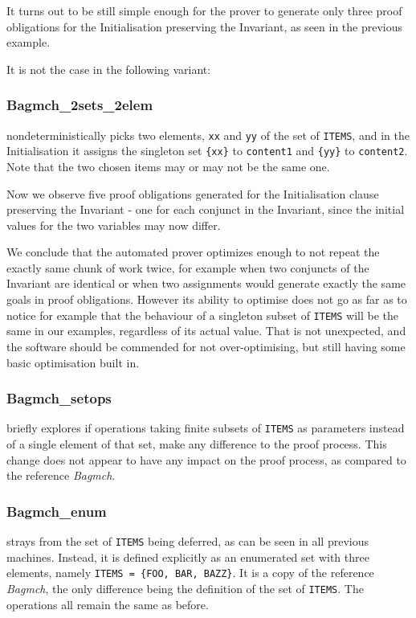 \documentclass[12pt,journal,duplex]{IEEEtran}
\begin{document}
	It turns out to be still simple enough for the prover to generate only three proof obligations for the Initialisation preserving the Invariant, as seen in the previous example.

	It is not the case in the following variant:

	\subsubsection{Bagmch\_2sets\_2elem} nondeterministically picks two elements, \texttt{xx} and \texttt{yy} of the set of \texttt{ITEMS}, and in the Initialisation it assigns the singleton set \texttt{\{xx\}} to \texttt{content1} and \texttt{\{yy\}} to \texttt{content2}. Note that the two chosen items may or may not be the same one.

	Now we observe five proof obligations generated for the Initialisation clause preserving the Invariant - one for each conjunct in the Invariant, since the initial values for the two variables may now differ.

	We conclude that the automated prover optimizes enough to not repeat the exactly same chunk of work twice, for example when two conjuncts of the Invariant are identical or when two assignments would generate exactly the same goals in proof obligations. However its ability to optimise does not go as far as to notice for example that the behaviour of a singleton subset of \texttt{ITEMS} will be the same in our examples, regardless of its actual value. That is not unexpected, and the software should be commended for not over-optimising, but still having some basic optimisation built in.

	\subsubsection{Bagmch\_setops} briefly explores if operations taking finite subsets of \texttt{ITEMS} as parameters instead of a single element of that set, make any difference to the proof process. This change does not appear to have any impact on the proof process, as compared to the reference \emph{Bagmch}.

	\subsubsection{Bagmch\_enum} strays from the set of \texttt{ITEMS} being deferred, as can be seen in all previous machines. Instead, it is defined explicitly as an enumerated set with three elements, namely \texttt{ITEMS = \{FOO, BAR, BAZZ\}}. It is a copy of the reference \emph{Bagmch}, the only difference being the definition of the set of \texttt{ITEMS}. The operations all remain the same as before.
\end{document}
